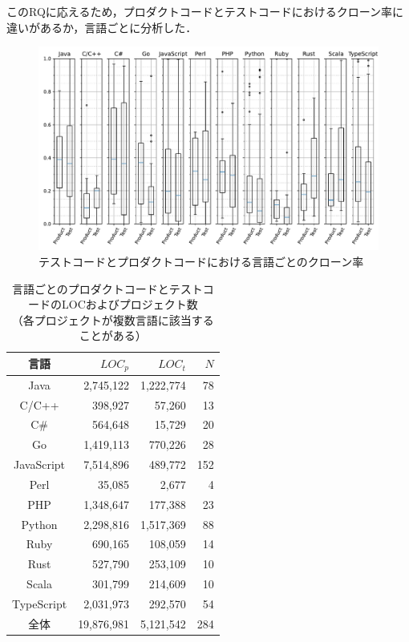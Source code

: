 \documentclass[T,J]{fose}
\begin{document}
このRQに応えるため，プロダクトコードとテストコードにおけるクローン率に違いがあるか，言語ごとに分析した．
\begin{figure}[tb]
    \centering
    \includegraphics[width=\textwidth]{images/RQ2.pdf}
    \caption{テストコードとプロダクトコードにおける言語ごとのクローン率}
    \label{fig:cloneRateOfTestAndProduct}
\end{figure}

\begin{table}[tb]
    \centering
    \caption{言語ごとのプロダクトコードとテストコードのLOCおよびプロジェクト数\\（各プロジェクトが複数言語に該当することがある）}
    \label{table:numberOfCloneSetCountByLabel}
    \begin{tabular}{|c|r|r|r|}
    \hline
    言語 & $LOC_p$ & $LOC_t$ & $N$\\
    \hline \hline
    Java & 2,745,122 & 1,222,774 & 78 \\
    \hline
    C/C++ & 398,927 & 57,260 & 13 \\
    \hline
    C\# & 564,648 & 15,729 & 20 \\
    \hline
    Go & 1,419,113 & 770,226 & 28 \\
    \hline
    JavaScript & 7,514,896 & 489,772 & 152 \\
    \hline
    Perl & 35,085 & 2,677 & 4 \\
    \hline
    PHP & 1,348,647 & 177,388 & 23 \\
    \hline
    Python & 2,298,816 & 1,517,369 & 88 \\
    \hline
    Ruby & 690,165 & 108,059 & 14 \\
    \hline
    Rust & 527,790 & 253,109 & 10 \\
    \hline
    Scala & 301,799 & 214,609 & 10 \\
    \hline
    TypeScript & 2,031,973 & 292,570 & 54 \\
    \hline \hline
    全体 & 19,876,981 & 5,121,542 & 284 \\
    \hline \hline
    \end{tabular}
\end{table}
\end{document}
